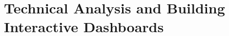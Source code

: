 \chapter{Technical Analysis and Building Interactive Dashboards\label{Technical Analysis and Building Interactive Dashboards}}
